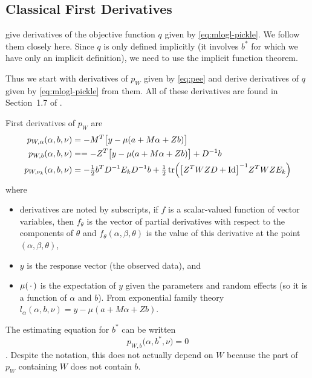 \subsection{Classical First Derivatives}

\citet{reaster-tr,reaster} give derivatives of the objective function $q$
given by \eqref{eq:mlogl-pickle}.  We follow them closely here.  Since
$q$ is only defined implicitly (it involves $b^*$ for which we have only
an implicit definition), we need to use the implicit function theorem.

Thus we start with derivatives of $p_W$ given by \eqref{eq:pee} and
derive derivatives of $q$ given by \eqref{eq:mlogl-pickle} from them.
All of these derivatives are found in Section~1.7 of \citet{reaster-tr}.

First derivatives of $p_W$ are
\begin{align}
   p_{W, \alpha}(\alpha, b, \nu)
   & =
   - M^T \bigl[ y - \mu(a + M \alpha + Z b) \bigr]
   \label{eq:p-alpha}
   \\
   p_{W, b}(\alpha, b, \nu)
   & =
   =
   - Z^T \bigl[ y - \mu(a + M \alpha + Z b) \bigr] + D^{- 1} b
   \label{eq:p-bee}
   \\
   p_{W, \nu_k}(\alpha, b, \nu)
   & =
   - \tfrac{1}{2} b^T D^{- 1} E_k D^{- 1} b
   + \tfrac{1}{2} \operatorname{tr} \Bigl(
   \bigl[ Z^T W Z D + \text{Id} \bigr]^{- 1}
   Z^T W Z E_k
   \Bigr)
   \label{eq:p-nu-k}
\end{align}
where
\begin{itemize}
\item derivatives are noted by subscripts, if $f$ is a scalar-valued function
    of vector variables, then $f_\theta$ is the vector of partial derivatives
    with respect to the components of $\theta$
    and $f_\theta(\alpha, \beta, \theta)$ is the
    value of this derivative at the point $(\alpha, \beta, \theta)$,
\item $y$ is the response vector (the observed data), and
\item $\mu(\,\cdot\,)$ is the expectation of $y$ given the parameters and
    random effects (so it is a function of $\alpha$ and $b$).
    From exponential family theory $l_\alpha(\alpha, b, \nu) =
    y - \mu(a + M \alpha + Z b)$.
\end{itemize}

The estimating equation for $b^*$ can be written
\begin{equation} \label{eq:estimating-bee-star}
   p_{W, b}\bigl(\alpha, b^*, \nu\bigr) = 0
\end{equation}
\citep[Section~1.7]{reaster-tr}.  Despite the notation, this does not
actually depend on $W$ because the part of $p_W$ containing $W$ does not
contain $b$.

